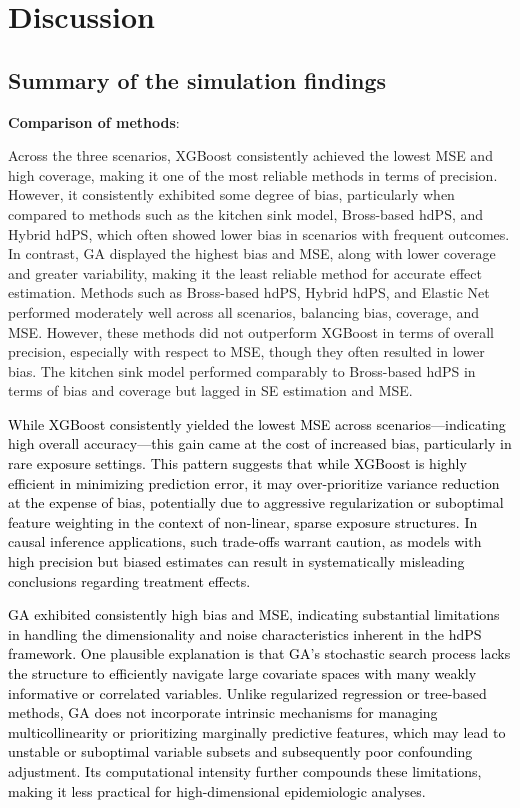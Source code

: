 \documentclass[10pt,letterpaper]{article}
\begin{document}
\section{Discussion}\label{discussion}

\subsection{Summary of the simulation
findings}\label{summary-of-the-simulation-findings}

\textbf{Comparison of methods}:

Across the three scenarios, XGBoost consistently achieved the lowest MSE
and high coverage, making it one of the most reliable methods in terms
of precision. However, it consistently exhibited some degree of bias,
particularly when compared to methods such as the kitchen sink model,
Bross-based hdPS, and Hybrid hdPS, which often showed lower bias in
scenarios with frequent outcomes. In contrast, GA displayed the highest
bias and MSE, along with lower coverage and greater variability, making
it the least reliable method for accurate effect estimation. Methods
such as Bross-based hdPS, Hybrid hdPS, and Elastic Net performed
moderately well across all scenarios, balancing bias, coverage, and MSE.
However, these methods did not outperform XGBoost in terms of overall
precision, especially with respect to MSE, though they often resulted in
lower bias. The kitchen sink model performed comparably to Bross-based
hdPS in terms of bias and coverage but lagged in SE estimation and MSE.

\textcolor{black}{While XGBoost consistently yielded the lowest MSE across scenarios—indicating high overall accuracy—this gain came at the cost of increased bias, particularly in rare exposure settings. This pattern suggests that while XGBoost is highly efficient in minimizing prediction error, it may over-prioritize variance reduction at the expense of bias, potentially due to aggressive regularization or suboptimal feature weighting in the context of non-linear, sparse exposure structures. In causal inference applications, such trade-offs warrant caution, as models with high precision but biased estimates can result in systematically misleading conclusions regarding treatment effects.}

\textcolor{black}{GA exhibited consistently high bias and MSE, indicating substantial limitations in handling the dimensionality and noise characteristics inherent in the hdPS framework. One plausible explanation is that GA’s stochastic search process lacks the structure to efficiently navigate large covariate spaces with many weakly informative or correlated variables. Unlike regularized regression or tree-based methods, GA does not incorporate intrinsic mechanisms for managing multicollinearity or prioritizing marginally predictive features, which may lead to unstable or suboptimal variable subsets and subsequently poor confounding adjustment. Its computational intensity further compounds these limitations, making it less practical for high-dimensional epidemiologic analyses.}
\end{document}

